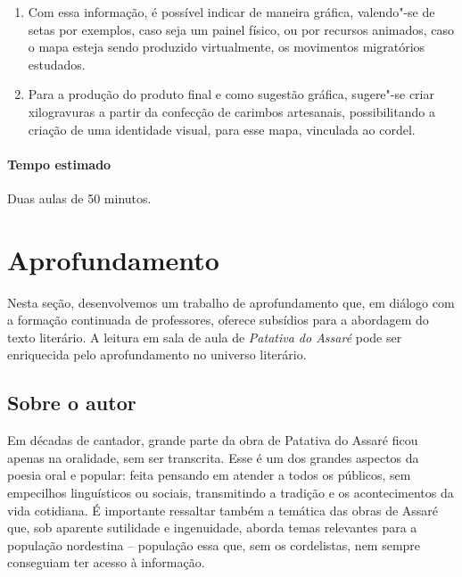 \documentclass[12pt]{extarticle}
\begin{document}
{\begin{enumerate}
Sugerimos também para esse exercício escutar a música de Luiz Gonzaga \href{https://www.youtube.com/watch?v=L9WSaMi2QhA&ab_channel=LuizGonzaga-Topic}{Pobreza por pobreza} que também retrata a situação nordestina da migração e seus 
anseios. 

\item
Com essa informação, é possível indicar de maneira gráfica, valendo"-se 
de setas por exemplos,
caso seja um painel físico, ou por recursos animados, caso o mapa esteja
sendo produzido virtualmente, os movimentos migratórios estudados. 

\item
Para a produção do produto final e como sugestão gráfica, sugere"-se criar xilogravuras a partir da confecção de carimbos artesanais, possibilitando 
a criação de uma identidade visual, para esse mapa, vinculada ao cordel.

\end{enumerate}

\paragraph{Tempo estimado} Duas aulas de 50 minutos. 


\section{Aprofundamento}

Nesta seção, desenvolvemos um trabalho de aprofundamento que, em diálogo
com a formação continuada de professores, oferece subsídios para a
abordagem do texto literário. A leitura em sala de aula de
\emph{Patativa do Assaré} pode ser enriquecida pelo aprofundamento no
universo literário.

\subsection{{Sobre o autor}}
Em décadas de cantador, grande parte da obra de Patativa do Assaré ficou
apenas na oralidade, sem ser transcrita. Esse é um dos grandes aspectos
da poesia oral e popular: feita pensando em atender a todos os públicos,
sem empecilhos linguísticos ou sociais, transmitindo a tradição e os
acontecimentos da vida cotidiana. É importante ressaltar também a
temática das obras de Assaré que, sob aparente sutilidade e ingenuidade,
aborda temas relevantes para a população nordestina -- população essa
que, sem os cordelistas, nem sempre conseguiam ter acesso à informação.

}
\end{document}
